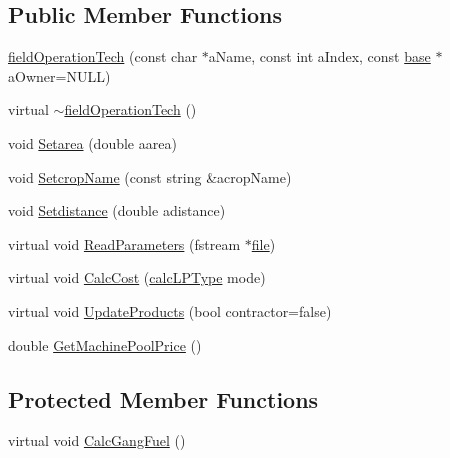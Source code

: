 \subsection*{Public Member Functions}
\begin{DoxyCompactItemize}
\item 
\hyperlink{classfield_operation_tech_a55967c049d29aae8062f19b6c8541596}{fieldOperationTech} (const char $\ast$aName, const int aIndex, const \hyperlink{classbase}{base} $\ast$aOwner=NULL)
\item 
virtual \hyperlink{classfield_operation_tech_a5ba3ad6f9dd43c2b7d740c24a528907a}{$\sim$fieldOperationTech} ()
\item 
void \hyperlink{classfield_operation_tech_a9efae05c7ed6af7c42c37a84f0c81e11}{Setarea} (double aarea)
\item 
void \hyperlink{classfield_operation_tech_a23e8464a61b31d7d6047627b0eda44df}{SetcropName} (const string \&acropName)
\item 
void \hyperlink{classfield_operation_tech_a4830e2b43c699fb767cc85242a59e875}{Setdistance} (double adistance)
\item 
virtual void \hyperlink{classfield_operation_tech_a2a2c416f3f3fe8ceb2f1f1b63c149a09}{ReadParameters} (fstream $\ast$\hyperlink{classbase_a3af52ee9891719d09b8b19b42450b6f6}{file})
\item 
virtual void \hyperlink{classfield_operation_tech_a908e81a53479de1a6768d58964dbc57c}{CalcCost} (\hyperlink{typer_8h_af05cf854fc14086a0d6404be5ae9813f}{calcLPType} mode)
\item 
virtual void \hyperlink{classfield_operation_tech_ab0b2bf71efca78b637837fc4d0e3a9d4}{UpdateProducts} (bool contractor=false)
\item 
double \hyperlink{classfield_operation_tech_a8d61005df70d41e8c1ddcdcf418ee65e}{GetMachinePoolPrice} ()
\end{DoxyCompactItemize}
\subsection*{Protected Member Functions}
\begin{DoxyCompactItemize}
\item 
virtual void \hyperlink{classfield_operation_tech_a530d49b4cf06668121b80eba679b7e98}{CalcGangFuel} ()
\end{DoxyCompactItemize}
